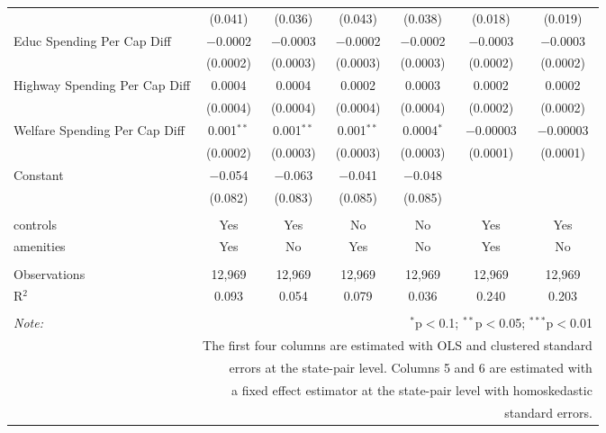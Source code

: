 \begin{table}[!htbp]
\begin{tabular}{@{\extracolsep{5pt}}lcccccc}
  & (0.041) & (0.036) & (0.043) & (0.038) & (0.018) & (0.019) \\ 
  Educ Spending Per Cap Diff & $-$0.0002 & $-$0.0003 & $-$0.0002 & $-$0.0002 & $-$0.0003 & $-$0.0003 \\ 
  & (0.0002) & (0.0003) & (0.0003) & (0.0003) & (0.0002) & (0.0002) \\ 
  Highway Spending Per Cap Diff & 0.0004 & 0.0004 & 0.0002 & 0.0003 & 0.0002 & 0.0002 \\ 
  & (0.0004) & (0.0004) & (0.0004) & (0.0004) & (0.0002) & (0.0002) \\ 
  Welfare Spending Per Cap Diff & 0.001$^{**}$ & 0.001$^{**}$ & 0.001$^{**}$ & 0.0004$^{*}$ & $-$0.00003 & $-$0.00003 \\ 
  & (0.0002) & (0.0003) & (0.0003) & (0.0003) & (0.0001) & (0.0001) \\ 
  Constant & $-$0.054 & $-$0.063 & $-$0.041 & $-$0.048 &  &  \\ 
  & (0.082) & (0.083) & (0.085) & (0.085) &  &  \\ 
 \hline \\[-1.8ex] 
controls & Yes & Yes & No & No & Yes & Yes \\ 
amenities & Yes & No & Yes & No & Yes & No \\ 
\hline \\[-1.8ex] 
Observations & 12,969 & 12,969 & 12,969 & 12,969 & 12,969 & 12,969 \\ 
R$^{2}$ & 0.093 & 0.054 & 0.079 & 0.036 & 0.240 & 0.203 \\ 
\hline 
\hline \\[-1.8ex] 
\textit{Note:}  & \multicolumn{6}{r}{$^{*}$p$<$0.1; $^{**}$p$<$0.05; $^{***}$p$<$0.01} \\ 
 & \multicolumn{6}{r}{The first four columns are estimated with OLS and clustered standard} \\ 
 & \multicolumn{6}{r}{ errors at the state-pair level. Columns 5 and 6 are estimated with} \\ 
 & \multicolumn{6}{r}{a fixed effect estimator at the state-pair level with homoskedastic} \\ 
 & \multicolumn{6}{r}{standard errors.} \\ 
\end{tabular} 
\end{table} 
